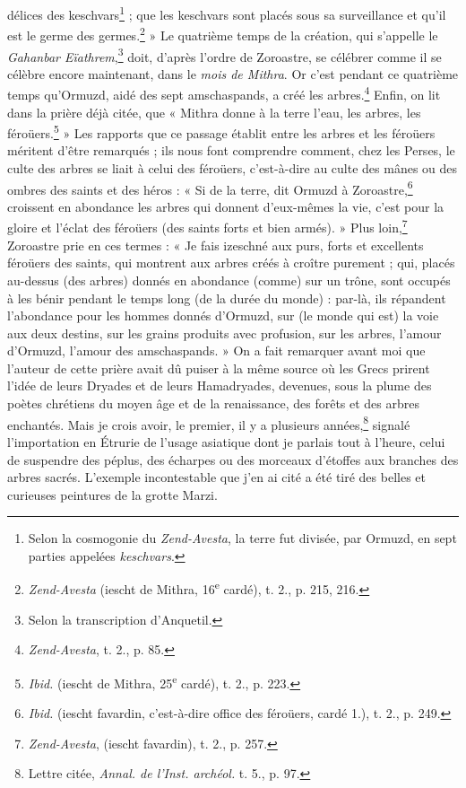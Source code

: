 \documentclass{article}
\begin{document}
délices des keschvars\footnote{Selon la cosmogonie du \emph{Zend-Avesta}, la terre fut divisée, par Ormuzd, en sept parties appelées \emph{keschvars}.} ; que les keschvars sont placés sous sa surveillance et qu'il est le germe des germes.\footnote{\emph{Zend-Avesta} (iescht de Mithra, 16\textsuperscript{e} cardé), t. 2., p. 215, 216.} » Le quatrième temps de la création, qui s'appelle le \emph{Gahanbar Eïathrem},\footnote{Selon la transcription d'Anquetil.} doit, d'après l'ordre de Zoroastre, se célébrer comme il se célèbre encore maintenant, dans le \emph{mois de Mithra}. Or c'est pendant ce quatrième temps qu'Ormuzd, aidé des sept amschaspands, a créé les arbres.\footnote{\emph{Zend-Avesta}, t. 2., p. 85.} Enfin, on lit dans la prière déjà citée, que « Mithra donne à la terre l'eau, les arbres, les féroüers.\footnote{\emph{Ibid.} (iescht de Mithra, 25\textsuperscript{e} cardé), t. 2., p. 223.} » Les rapports que ce passage établit entre les arbres et les féroüers méritent d'être remarqués ; ils nous font comprendre comment, chez les Perses, le culte des arbres se liait à celui des féroüers, c'est-à-dire au culte des mânes ou des ombres des saints et des héros : « Si de la terre, dit Ormuzd à Zoroastre,\footnote{\emph{Ibid.} (iescht favardin, c'est-à-dire office des féroüers, cardé 1.), t. 2., p. 249.} croissent en abondance les arbres qui donnent d'eux-mêmes la vie, c'est pour la gloire et l'éclat des féroüers (des saints forts et bien armés). » Plus loin,\footnote{\emph{Zend-Avesta}, (iescht favardin), t. 2., p. 257.} Zoroastre prie en ces termes : « Je fais izeschné aux purs, forts et excellents féroüers des saints, qui montrent aux arbres créés à croître purement ; qui, placés au-dessus (des arbres) donnés en abondance (comme) sur un trône, sont occupés à les bénir pendant le temps long (de la durée du monde) : par-là, ils répandent l'abondance pour les hommes donnés d'Ormuzd, sur (le monde qui est) la voie aux deux destins, sur les grains produits avec profusion, sur les arbres, l'amour d'Ormuzd, l'amour des amschaspands. » On a fait remarquer avant moi que l'auteur de cette prière avait dû puiser à la même source où les Grecs prirent l'idée de leurs Dryades et de leurs Hamadryades, devenues, sous la plume des poètes chrétiens du moyen âge et de la renaissance, des forêts et des arbres enchantés. Mais je crois avoir, le premier, il y a plusieurs années,\footnote{Lettre citée, \emph{Annal. de l'Inst. archéol.} t. 5., p. 97.} signalé l'importation en Étrurie de l'usage asiatique dont je parlais tout à l'heure, celui de suspendre des péplus, des écharpes ou des morceaux d'étoffes aux branches des arbres sacrés. L'exemple incontestable que j'en ai cité a été tiré des belles et curieuses peintures de la grotte Marzi.
\end{document}
